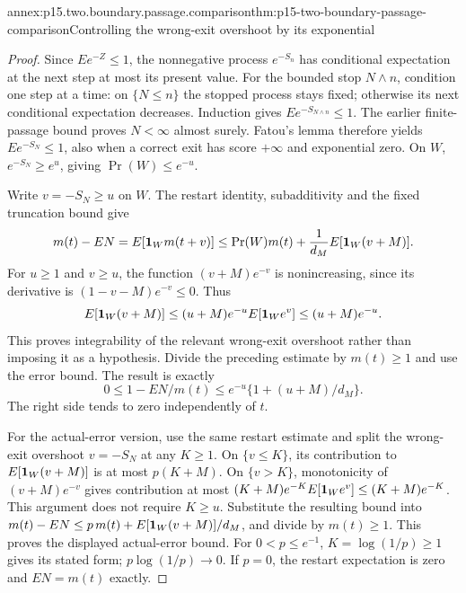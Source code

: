 \begin{annexitem}{annex:p15.two.boundary.passage.comparison}{thm:p15-two-boundary-passage-comparison}{Controlling the wrong-exit overshoot by its exponential}
\begin{proof}
Since \(Ee^{-Z}\leq1\), the nonnegative process \(e^{-S_n}\)
has conditional expectation at the next step at most its present value.
For the bounded stop \(N\wedge n\), condition one step at a time:
on \(\{N\leq n\}\) the stopped process stays fixed; otherwise its
next conditional expectation decreases. Induction gives
\(Ee^{-S_{N\wedge n}}\leq1\).
The earlier finite-passage bound proves \(N<\infty\) almost surely.
Fatou's lemma therefore yields \(Ee^{-S_N}\leq1\), also when
a correct exit has score \(+\infty\) and exponential zero.
On \(W\), \(e^{-S_N}\geq e^u\), giving \(\Pr(W)\leq e^{-u}\).

Write \(v=-S_N\geq u\) on \(W\). The restart identity, subadditivity
and the fixed truncation bound give
\[
 m(t)-EN
 =E[{\bf1}_Wm(t+v)]
 \leq \Pr(W)m(t)+\frac1{d_M}E[{\bf1}_W(v+M)].
\]
For \(u\geq1\) and \(v\geq u\), the function
\((v+M)e^{-v}\) is nonincreasing, since its derivative is
\((1-v-M)e^{-v}\leq0\). Thus
\[
 E[{\bf1}_W(v+M)]
 \leq (u+M)e^{-u}E[{\bf1}_W e^v]
 \leq(u+M)e^{-u}.
\]
This proves integrability of the relevant wrong-exit overshoot rather
than imposing it as a hypothesis.
Divide the preceding estimate by \(m(t)\geq1\) and use the error
bound. The result is exactly
\[
 0\leq1-EN/m(t)
 \leq e^{-u}\{1+(u+M)/d_M\}.
\]
The right side tends to zero independently of \(t\).

For the actual-error version, use the same restart estimate and split
the wrong-exit overshoot \(v=-S_N\) at any \(K\geq1\).
On \(\{v\leq K\}\), its contribution to
\(E[{\bf1}_W(v+M)]\) is at most \(p(K+M)\).
On \(\{v>K\}\), monotonicity of \((v+M)e^{-v}\) gives contribution
at most \((K+M)e^{-K}E[{\bf1}_W e^v]\leq(K+M)e^{-K}\).
This argument does not require \(K\geq u\).
Substitute the resulting bound into
\(m(t)-EN\leq p\,m(t)+E[{\bf1}_W(v+M)]/d_M\), and divide by
\(m(t)\geq1\). This proves the displayed actual-error bound.
For \(0<p\leq e^{-1}\), \(K=\log(1/p)\geq1\) gives its stated form;
\(p\log(1/p)\to0\). If \(p=0\), the restart expectation is zero
and \(EN=m(t)\) exactly.
\end{proof}
\end{annexitem}

